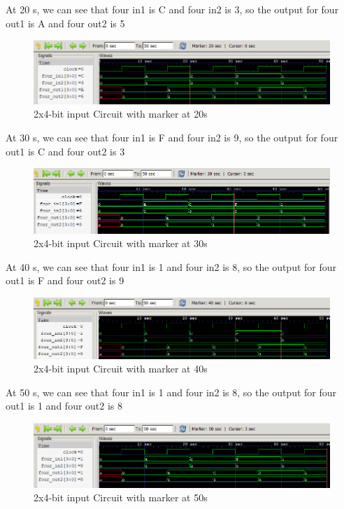 \documentclass[12pt]{article}
\begin{document}
At 20 s, we can see that four in1 is C and four in2 is 3, so the output for four out1 is A and four out2 is 5
\begin{figure}[h]
    \centering
    \includegraphics[width = 1.0\textwidth]{figs/Input20.png}
    \caption{2x4-bit input Circuit with marker at 20s}
    \label{fig:enter-label}
\end{figure}

\newpage

At 30 s, we can see that four in1 is F and four in2 is 9, so the output for four out1 is C and four out2 is 3
\begin{figure}[h]
    \centering
    \includegraphics[width = 1.0\textwidth]{figs/Input30.png}
    \caption{2x4-bit input Circuit with marker at 30s}
    \label{fig:enter-label}
\end{figure}

At 40 s, we can see that four in1 is 1 and four in2 is 8, so the output for four out1 is F and four out2 is 9
\begin{figure}[h]
    \centering
    \includegraphics[width = 1.0\textwidth]{figs/Input40.png}
    \caption{2x4-bit input Circuit with marker at 40s}
    \label{fig:enter-label}
\end{figure}

At 50 s, we can see that four in1 is 1 and four in2 is 8, so the output for four out1 is 1 and four out2 is 8
\begin{figure}[h]
    \centering
    \includegraphics[width = 1.0\textwidth]{figs/Input50.png}
    \caption{2x4-bit input Circuit with marker at 50s}
    \label{fig:enter-label}
\end{figure}
\end{document}
